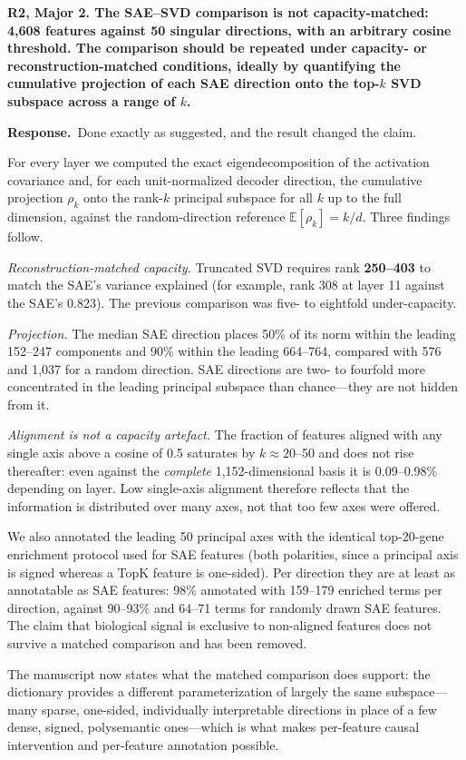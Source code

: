 \documentclass[11pt]{article}
\newcommand{\point}[1]{\vspace{0.7em}\noindent\textbf{#1}\par\vspace{0.15em}}
\newcommand{\reply}{\par\vspace{0.3em}\noindent\textbf{Response.}\ }
\begin{document}
\point{R2, Major 2. The SAE--SVD comparison is not capacity-matched: 4,608 features against 50
singular directions, with an arbitrary cosine threshold. The comparison should be repeated under
capacity- or reconstruction-matched conditions, ideally by quantifying the cumulative projection of
each SAE direction onto the top-$k$ SVD subspace across a range of $k$.}
\reply Done exactly as suggested, and the result changed the claim.

For every layer we computed the exact eigendecomposition of the activation covariance and, for each
unit-normalized decoder direction, the cumulative projection $\rho_k$ onto the rank-$k$ principal
subspace for all $k$ up to the full dimension, against the random-direction reference
$\mathbb{E}[\rho_k] = k/d$. Three findings follow.

\emph{Reconstruction-matched capacity.} Truncated SVD requires rank \textbf{250--403} to match the
SAE's variance explained (for example, rank 308 at layer 11 against the SAE's 0.823). The previous
comparison was five- to eightfold under-capacity.

\emph{Projection.} The median SAE direction places 50\% of its norm within the leading 152--247
components and 90\% within the leading 664--764, compared with 576 and 1,037 for a random
direction. SAE directions are two- to fourfold more concentrated in the leading principal subspace
than chance---they are not hidden from it.

\emph{Alignment is not a capacity artefact.} The fraction of features aligned with any single axis
above a cosine of 0.5 saturates by $k \approx 20$--50 and does not rise thereafter: even against
the \emph{complete} 1,152-dimensional basis it is 0.09--0.98\% depending on layer. Low single-axis
alignment therefore reflects that the information is distributed over many axes, not that too few
axes were offered.

We also annotated the leading 50 principal axes with the identical top-20-gene enrichment protocol
used for SAE features (both polarities, since a principal axis is signed whereas a TopK feature is
one-sided). Per direction they are at least as annotatable as SAE features: 98\% annotated with
159--179 enriched terms per direction, against 90--93\% and 64--71 terms for randomly drawn SAE
features. The claim that biological signal is exclusive to non-aligned features does not survive a
matched comparison and has been removed.

The manuscript now states what the matched comparison does support: the dictionary provides a
different parameterization of largely the same subspace---many sparse, one-sided, individually
interpretable directions in place of a few dense, signed, polysemantic ones---which is what makes
per-feature causal intervention and per-feature annotation possible.
\end{document}

